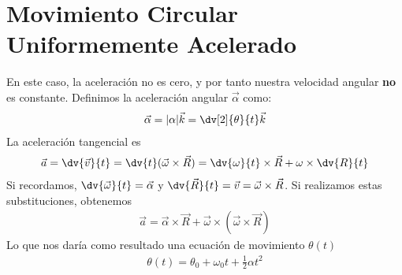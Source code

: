 \documentclass{article}
\begin{document}
\section{Movimiento Circular Uniformemente Acelerado}
En este caso, la aceleración no es cero, y por tanto nuestra velocidad angular \textbf{no} es constante. Definimos la
aceleración angular $\vec{\alpha}$ como:
\begin{equation}
    \begin{split}
        \vec{\alpha}=|\alpha|\vec{k}=\dv[2]{\theta}{t}\vec{k}
    \end{split}
\end{equation}
La aceleración tangencial es
\begin{equation}
    \begin{split}
        \vec{a}=\dv{\vec{v}}{t}=\dv{t} (\vec{\omega}\times \vec{R})= \dv{\omega}{t}\times \vec{R}+ \omega\times\dv{R}{t}
    \end{split}
\end{equation}
Si recordamos, $\dv{\vec{\omega}}{t}=\vec{\alpha}$ y $\dv{\vec{R}}{t}=\vec{v}=\vec{\omega}\times \vec{R}$. Si realizamos
estas substituciones, obtenemos
\begin{equation}
    \begin{split}
        \vec{a}=\vec{\alpha}\times \vec{R}+ \vec{\omega}\times (\vec{\omega}\times \vec{R})
    \end{split}
\end{equation} 
Lo que nos daría como resultado una ecuación de movimiento $\theta(t)$
\begin{equation}
    \begin{split}
        \theta(t)=\theta_0+\omega_0t+ \frac{1}{2}\alpha t ^{2}
    \end{split}
\end{equation} 
\end{document}

